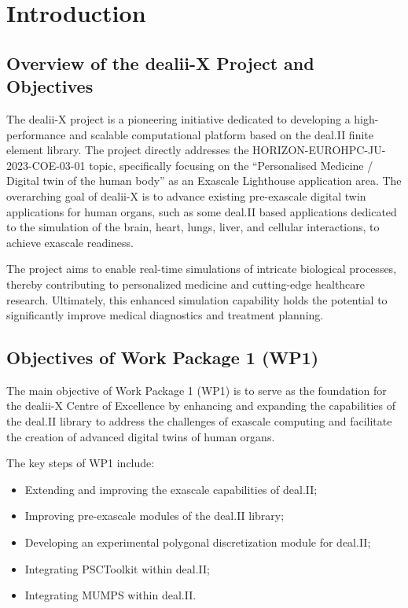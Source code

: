 \documentclass[a4paper,12pt]{article}
\begin{document}
\vspace*{2cm}

\disclaimer

\newpage

\tableofcontents %

\newpage

\section{Introduction}
    \subsection{Overview of the dealii-X Project and Objectives}

The dealii-X project is a pioneering initiative dedicated to developing a
high-performance and scalable computational platform based on the deal.II finite
element library. The project directly addresses the
HORIZON-EUROHPC-JU-2023-COE-03-01 topic, specifically focusing on the
``Personalised Medicine / Digital twin of the human body'' as an Exascale
Lighthouse application area. The overarching goal of dealii-X is to advance
existing pre-exascale digital twin applications for human organs, such as some
deal.II based applications dedicated to the simulation of the brain, heart,
lungs, liver, and cellular interactions, to achieve exascale readiness. 

The project aims to enable real-time simulations of intricate biological
processes, thereby contributing to personalized medicine and cutting-edge
healthcare research. Ultimately, this enhanced simulation capability holds the
potential to significantly improve medical diagnostics and treatment planning.

\subsection{Objectives of Work Package 1 (WP1)}

The main objective of Work Package 1 (WP1) is to serve as the foundation
for the dealii-X Centre of Excellence by enhancing and expanding the
capabilities of the deal.II library to address the challenges of exascale
computing and facilitate the creation of advanced digital twins of human
organs.

The key steps of WP1 include:
\begin{itemize}
    \item Extending and improving the exascale capabilities of deal.II;
    \item Improving pre-exascale modules of the deal.II library;
    \item Developing an experimental polygonal discretization module for deal.II;
    \item Integrating PSCToolkit within deal.II;
    \item Integrating MUMPS within deal.II.
\end{itemize}
\end{document}
